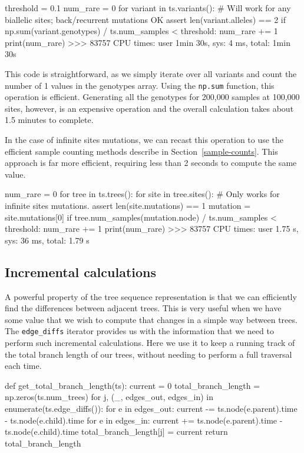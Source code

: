 \documentclass[graybox]{svmult}
\begin{document}
\begin{pythoncode}
threshold = 0.1
num_rare = 0
for variant in ts.variants():
    # Will work for any biallelic sites; back/recurrent mutations OK
    assert len(variant.alleles) == 2
    if np.sum(variant.genotypes) / ts.num_samples < threshold:
        num_rare += 1
print(num_rare)
>>> 83757
CPU times: user 1min 30s, sys: 4 ms, total: 1min 30s
\end{pythoncode}

This code is straightforward, as we simply iterate over all variants and
count the number of 1 values in the genotypes array. Using the \texttt{np.sum}
function, this operation is efficient. Generating all the genotypes for
200,000 samples at 100,000 sites, however,
is an expensive operation and the overall calculation takes about 1.5 minutes
to complete.

In the case of infinite sites mutations, we can recast this operation
to use the efficient sample counting methods describe in
Section~\ref{sample-counts}. This approach is far more
efficient, requiring less than 2 seconds to compute the same value.
\begin{pythoncode}
num_rare = 0
for tree in ts.trees():
    for site in tree.sites():
        # Only works for infinite sites mutations.
        assert len(site.mutations) == 1
        mutation = site.mutations[0]
        if tree.num_samples(mutation.node) / ts.num_samples < threshold:
            num_rare += 1
print(num_rare)
>>> 83757
CPU times: user 1.75 s, sys: 36 ms, total: 1.79 s
\end{pythoncode}

\subsection{Incremental calculations}\label{incremental-calculations}

A powerful property of the tree sequence representation is that we can
efficiently find the differences between adjacent trees. This is very
useful when we have some value that we wish to compute that changes in a
simple way between trees. The \texttt{edge\_diffs} iterator provides us
with the information that we need to perform such incremental
calculations. Here we use it to keep a running track of the total branch
length of our trees, without needing to perform a full traversal each
time.

\begin{pythoncode}
def get_total_branch_length(ts):
    current = 0
    total_branch_length = np.zeros(ts.num_trees)
    for j, (_, edges_out, edges_in) in enumerate(ts.edge_diffs()):
        for e in edges_out:
            current -= ts.node(e.parent).time - ts.node(e.child).time
        for e in edges_in:
            current += ts.node(e.parent).time - ts.node(e.child).time
        total_branch_length[j] = current
    return total_branch_length
\end{pythoncode}
\end{document}
